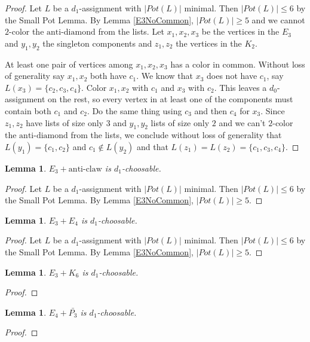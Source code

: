 \documentclass[12pt]{article}
\theoremstyle{plain}
\newtheorem{lem}[thm]{Lemma}
\theoremstyle{definition}
\theoremstyle{remark}
\begin{document}
\begin{proof}
Let $L$ be a $d_1$-assignment with $|Pot(L)|$ minimal. Then $|Pot(L)| \leq 6$ by the Small Pot Lemma.  By Lemma \ref{E3NoCommon}, $|Pot(L)| \geq 5$ and we cannot $2$-color the $\text{anti-diamond}$ from the lists. Let $x_1, x_2, x_3$ be the vertices in the $E_3$ and $y_1, y_2$ the singleton components and $z_1, z_2$ the vertices in the $K_2$.\newline

At least one pair of vertices among $x_1, x_2, x_3$ has a color in common.  Without loss of generality say $x_1, x_2$ both have $c_1$.  We know that $x_3$ does not have $c_1$, say $L(x_3) = \{c_2, c_3, c_4\}$.  Color $x_1, x_2$ with $c_1$ and $x_3$ with $c_2$.  This leaves a $d_0$-assignment on the rest, so every vertex in at least one of the components must contain both $c_1$ and $c_2$.  Do the same thing using $c_3$ and then $c_4$ for $x_3$.  Since $z_1, z_2$ have lists of size only $3$ and $y_1, y_2$ lists of size only $2$ and we can't $2$-color the $\text{anti-diamond}$ from the lists, we conclude without loss of generality that $L(y_1) = \{c_1, c_2\}$ and $c_1 \not \in L(y_2)$ and that $L(z_1) = L(z_2) = \{c_1, c_3, c_4\}$.\newline
\end{proof}

\begin{lem}\label{E3PlusClawBar}
$E_3 +  \text{anti-claw}$ is $d_1$-choosable.
\end{lem}
\begin{proof}
Let $L$ be a $d_1$-assignment with $|Pot(L)|$ minimal. Then $|Pot(L)| \leq 6$ by the Small Pot Lemma.  By Lemma \ref{E3NoCommon}, $|Pot(L)| \geq 5$.
\end{proof}
\begin{lem}\label{E3PlusE4}
$E_3 + E_4$ is $d_1$-choosable.
\end{lem}
\begin{proof}
Let $L$ be a $d_1$-assignment with $|Pot(L)|$ minimal. Then $|Pot(L)| \leq 6$ by the Small Pot Lemma.  By Lemma \ref{E3NoCommon}, $|Pot(L)| \geq 5$.
\end{proof}
\begin{lem}\label{E3PlusK6}
$E_3 + K_6$ is $d_1$-choosable.
\end{lem}
\begin{proof}
\end{proof}
\begin{lem}\label{E4PlusP3Bar}
$E_4 + \bar{P_3}$ is $d_1$-choosable.
\end{lem}
\begin{proof}
\end{proof}
\end{document}
